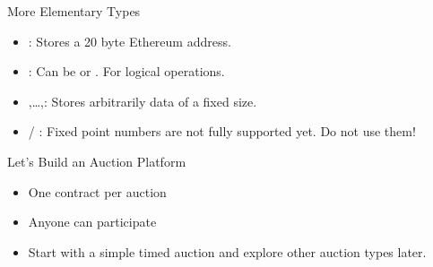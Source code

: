 \documentclass[handout]{beamer}
\begin{document}
\begin{frame}{More Elementary Types}

	\begin{itemize}
		\item<1-> : Stores a 20 byte Ethereum address.
		\item<1-> : Can be  or . For logical operations.
		\item<1-> ,\dots,: Stores arbitrarily data of a fixed size.
		\item<1->  / : Fixed point numbers are not fully supported yet. Do not use them!
	\end{itemize}
	
	\vspace{1em}
	
	
\end{frame}

\begin{frame}{Let's Build an Auction Platform}

	\begin{itemize}
		\item<1-> One contract per auction
		\item<1-> Anyone can participate
		\item<1-> Start with a simple timed auction and explore other auction types later.
	\end{itemize}
	
	
\end{frame}
\end{document}
